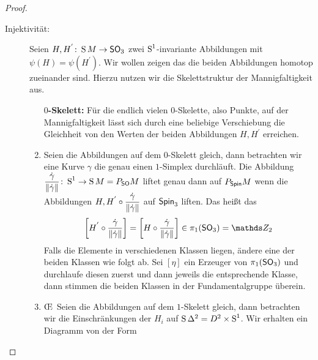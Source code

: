 \begin{Satz}
\begin{proof}
          \begin{description}
	          	\item[Injektivität:] Seien $ \abb{H,H^{'}}{\S M}{\so_3} $
	          	zwei $ \S^1 $-invariante Abbildungen mit $ \psi(H)=\psi(H^{'}) $. Wir wollen zeigen das die beiden
	          	Abbildungen homotop zueinander sind. Hierzu nutzen wir
	          	die Skelettstruktur der Mannigfaltigkeit aus.
		          	\begin{enumerate}
		          		\item[$ 0 ${\bfseries-Skelett:}] Für die endlich vielen $ 0 $-Skelette, also
		          		Punkte, auf der Mannigfaltigkeit lässt sich durch
		          		eine beliebige Verschiebung die Gleichheit von
		          		den Werten der beiden Abbildungen $ H,H^{'} $
		          		erreichen.
		          		\item Seien die Abbildungen auf dem $ 0 $-Skelett
		          		gleich, dann betrachten wir eine Kurve $ \gamma $
		          		die genau einen $ 1 $-Simplex durchläuft.
		          		Die Abbildung $ \abb{\dfrac{\dot{\gamma}}{\norm{\dot{\gamma}}}}{\S^1}{\S M = \Ph{\so}{M}} $ liftet genau dann auf $ \Ph{\spin}{M} $ wenn die Abbildungen
		          		$ H,H^{'} \circ \dfrac{\dot{\gamma}}{\norm{\dot{\gamma}}} $ auf
		          		$ \spin_3 $ liften. Das heißt das 
		          		\begin{gather*}
		          			 \left[H^{'} \circ \dfrac{\dot{\gamma}}{\norm{\dot{\gamma}}} \right]
		          			 = \left[ H \circ \dfrac{\dot{\gamma}}{\norm{\dot{\gamma}}} \right] \in \pi_1(\so_3)=\Z_2
		          		\end{gather*}
		          		Falls die Elemente in verschiedenen Klassen 
		          		liegen, ändere eine der beiden Klassen wie folgt
		          		ab. Sei $ [\eta] $ ein Erzeuger von $ \pi_1(\so_3) $ und durchlaufe diesen zuerst
		          		und dann jeweils die entsprechende Klasse, dann
		          		stimmen die beiden Klassen in der Fundamentalgruppe überein.
		          		
		          		
			          	\item \OE~Seien die Abbildungen auf dem $ 1 $-Skelett gleich, dann betrachten wir die
			          	Einschränkungen der $ H_i $ auf $ \S \Delta^2 = D^2 \times \S^1$. Wir erhalten ein Diagramm
			          	von der Form
			          	
			          	\begin{center}
			          	\end{center}
			          	

\end{enumerate}
\end{description}
\end{proof}
\end{Satz}
